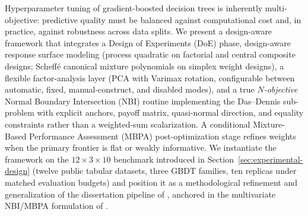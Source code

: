 Hyperparameter tuning of gradient-boosted decision trees is inherently
multi-objective: predictive quality must be balanced against
computational cost and, in practice, against robustness across data
splits. We present a design-aware framework that integrates a Design of
Experiments (DoE) phase, design-aware response surface modeling
(process quadratic on factorial and central composite designs;
Scheff\'{e} canonical mixture polynomials on simplex weight designs), a
flexible factor-analysis layer (PCA with Varimax rotation, configurable
between automatic, fixed, manual-construct, and disabled modes), and a
true \emph{$N$-objective} Normal Boundary Intersection (NBI) routine
implementing the Das--Dennis sub-problem with explicit anchors, payoff
matrix, quasi-normal direction, and equality constraints rather than a
weighted-sum scalarization. A conditional Mixture-Based Performance
Assessment (MBPA) post-optimization stage refines weights when the
primary frontier is flat or weakly informative. We instantiate the
framework on the
$12{\times}3{\times}10$ benchmark introduced in
Section~\ref{sec:experimental-design} (twelve public tabular datasets,
three GBDT families, ten replicas under matched evaluation budgets) and
position it as a methodological refinement and generalization of the
dissertation pipeline of \citep{ribeiro2026dissertation}, anchored in
the multivariate NBI/MBPA formulation of \citep{pereira2025eaai}.
